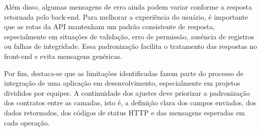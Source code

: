Além disso, algumas mensagens de erro ainda podem variar conforme a resposta retornada pelo back-end. Para melhorar a experiência do usuário, é importante que as rotas da API mantenham um padrão consistente de resposta, especialmente em situações de validação, erro de permissão, ausência de registros ou falhas de integridade. Essa padronização facilita o tratamento das respostas no front-end e evita mensagens genéricas.

Por fim, destaca-se que as limitações identificadas fazem parte do processo de integração de uma aplicação em desenvolvimento, especialmente em projetos divididos por equipes. A continuidade dos ajustes deve priorizar a padronização dos contratos entre as camadas, isto é, a definição clara dos campos enviados, dos dados retornados, dos códigos de status HTTP e das mensagens esperadas em cada operação.